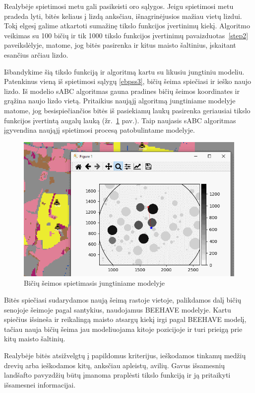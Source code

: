 \documentclass{VUMIFPSmagistrinis}
\begin{document}
Realybėje spietimosi metu gali pasikeisti oro sąlygos. Jeigu spietimosi metu pradeda lyti, bitės keliaus į lizdą anksčiau, išnagrinėjusios mažiau vietų lizdui. Tokį elgesį galime atkartoti sumažinę tikslo funkcijos įvertinimų kiekį. Algoritmo veikimas su 100 bičių ir tik 1000 tikslo funkcijos įvertinimų pavaizduotas~\ref{step2} paveikslėlyje, matome, jog bitės pasirenka ir kitus maisto šaltinius, įskaitant esančius arčiau lizdo. 




Išbandykime šią tikslo funkciją ir algoritmą kartu su likusiu jungtiniu modeliu. Patenkinus vieną iš spietimosi sąlygų \eqref{ebpss3}, bičių šeima spiečiasi ir ieško naujo lizdo. Iš modelio sABC algoritmas gauna pradines bičių šeimos koordinates ir grąžina naujo lizdo vietą. Pritaikius naująjį algoritmą jungtiniame modelyje matome, jog besispiečiančios bitės iš pasiekiamų laukų pasirenka geriausiai tikslo funkcijos įvertintą augalų lauką (žr.~\ref{img:fin1} pav.). Taip naujasis sABC algoritmas įgyvendina naująjį spietimosi procesą patobulintame modelyje.

\begin{figure}
    \centering
    \includegraphics[scale=0.75]{img/new/mags.png}
     \caption{Bičių šeimos spietimasis jungtiniame modelyje}
    \label{img:fin1}
\end{figure}

Bitės spiečiasi sudarydamos naują šeimą rastoje vietoje, palikdamos dalį bičių senojoje šeimoje pagal santykius, naudojamus BEEHAVE modelyje. Kartu spiečius išsineša ir reikalingą maisto atsargų kiekį irgi pagal BEEHAVE modelį, tačiau nauja bičių šeima jau modeliuojama kitoje pozicijoje ir turi prieigą prie kitų maisto šaltinių.

Realybėje bitės atsižvelgtų į papildomus kriterijus, ieškodamos tinkamų medžių drevių arba ieškodamos kitų, anksčiau apleistų, avilių. Gavus išsamesnių landšafto pavyzdžių būtų įmanoma praplėsti tikslo funkciją ir ją pritaikyti išsamesnei informacijai. 
\end{document}
